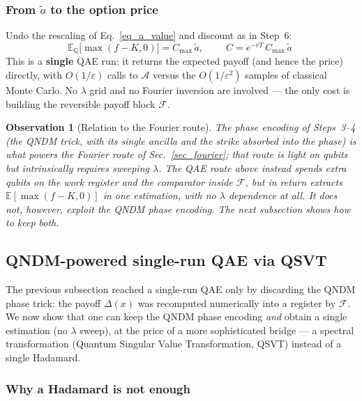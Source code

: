 \documentclass{article}
\newtheorem{remark}{Observation}
\begin{document}
\subsubsection{From $\tilde a$ to the option price}

Undo the rescaling of Eq.~\eqref{eq_a_value} and discount as in Step~6:
\begin{equation}
\mathbb{E}_{\mathbb{Q}}\!\big[\max(f-K,0)\big] = C_{\max}\,\tilde a,
\qquad
\boxed{\;C = e^{-rT}\,C_{\max}\,\tilde a\;}
\end{equation}
This is a \textbf{single} QAE run: it returns the expected payoff (and hence the price) directly, with $O(1/\varepsilon)$ calls to $\mathcal{A}$ versus the $O(1/\varepsilon^2)$ samples of classical Monte Carlo. No $\lambda$ grid and no Fourier inversion are involved --- the only cost is building the reversible payoff block $\mathcal{F}$.

\begin{remark}[Relation to the Fourier route]
The phase encoding of Steps~3--4 (the QNDM trick, with its single ancilla and the strike absorbed into the phase) is what powers the \emph{Fourier} route of Sec.~\ref{sec_fourier}; that route is light on qubits but intrinsically requires sweeping $\lambda$. The QAE route above instead spends extra qubits on the work register and the comparator inside $\mathcal{F}$, but in return extracts $\mathbb{E}[\max(f-K,0)]$ in one estimation, with no $\lambda$ dependence at all. It does not, however, exploit the QNDM phase encoding. The next subsection shows how to keep \emph{both}.
\end{remark}

\subsection{QNDM-powered single-run QAE via QSVT}\label{sec_qsvt}

The previous subsection reached a single-run QAE only by discarding the QNDM phase trick: the payoff $\Delta(x)$ was recomputed numerically into a register by $\mathcal{F}$. We now show that one can keep the QNDM phase encoding \emph{and} obtain a single estimation (no $\lambda$ sweep), at the price of a more sophisticated bridge --- a spectral transformation (Quantum Singular Value Transformation, QSVT) instead of a single Hadamard.

\subsubsection{Why a Hadamard is not enough}
\end{document}
